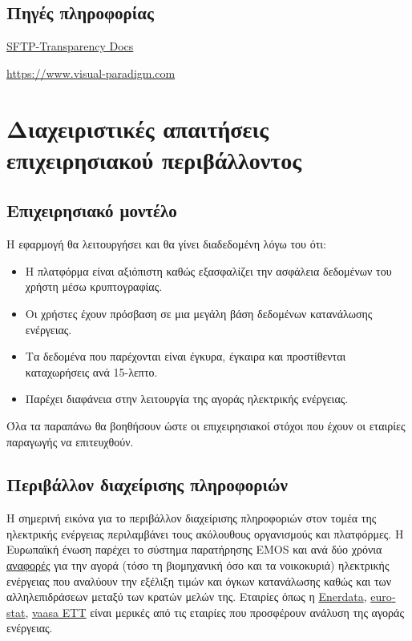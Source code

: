 \documentclass[a4paper,12pt, oneside]{article}
\begin{document}
\subsection*{Πηγές πληροφορίας}
\begingroup
\latintext
\sloppy
\begin{enumerate}
\begin{sloppypar}
   \item \href{https://transparency.entsoe.eu/content/static\_content/Static\%20content/knowledge\%20base/SFTP-Transparency\_Docs.html}{SFTP-Transparency Docs}
   \end{sloppypar}
   \item  \href{https://www.visual-paradigm.com}{https://www.visual-paradigm.com}
\end{enumerate}
\endgroup
\greektext


\section{Διαχειριστικές απαιτήσεις επιχειρησιακού περιβάλλοντος} 
\subsection{Επιχειρησιακό μοντέλο}
Η εφαρμογή θα λειτουργήσει και θα γίνει διαδεδομένη λόγω του ότι:
\begin{itemize}
  \item Η πλατφόρμα είναι αξιόπιστη καθώς εξασφαλίζει την ασφάλεια δεδομένων του χρήστη μέσω κρυπτογραφίας.
  \item Οι χρήστες έχουν πρόσβαση σε μια μεγάλη βάση δεδομένων κατανάλωσης ενέργειας.
  \item Τα δεδομένα που παρέχονται είναι έγκυρα, έγκαιρα και προστίθενται καταχωρήσεις ανά 15-λεπτο.
  \item Παρέχει διαφάνεια στην λειτουργία της αγοράς ηλεκτρικής ενέργειας.
\end{itemize}
Όλα τα παραπάνω θα βοηθήσουν ώστε οι επιχειρησιακοί στόχοι που έχουν οι εταιρίες παραγωγής να επιτευχθούν.

\subsection{Περιβάλλον διαχείρισης πληροφοριών}
Η σημερινή εικόνα για το περιβάλλον διαχείρισης πληροφοριών  στον τομέα της ηλεκτρικής ενέργειας περιλαμβάνει τους ακόλουθους οργανισμούς και πλατφόρμες. Η Ευρωπαϊκή ένωση παρέχει το σύστημα παρατήρησης \textlatin{EMOS} και ανά δύο χρόνια \href{https://ec.europa.eu/energy/en/data-analysis/market-analysis#gas-and-electricity-market-reports}{αναφορές} για την αγορά (τόσο τη βιομηχανική όσο και τα νοικοκυριά) ηλεκτρικής ενέργειας  που αναλύουν την εξέλιξη τιμών και όγκων κατανάλωσης καθώς και των αλληλεπιδράσεων μεταξύ των κρατών μελών της. Εταιρίες όπως η \href{https://www.enerdata.net}{\textlatin{Enerdata}}, \href{https://ec.europa.eu/eurostat/web/energy}{\textlatin{eurostat}}, \href{http://www.vaasaett.com}{\textlatin{vaasa ETT}} είναι μερικές από τις εταιρίες που προσφέρουν ανάλυση της αγοράς ενέργειας. 
\newpage
\end{document}
